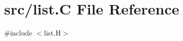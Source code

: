 \hypertarget{list_8_c}{}\section{src/list.C File Reference}
\label{list_8_c}
{\ttfamily \#include $<$list.\+H$>$}\newline
